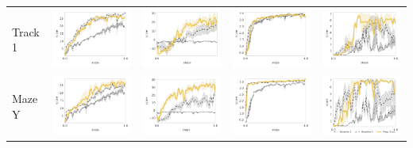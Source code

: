 \begin{table}
\begin{tabular}{m{} >{\centering}m{} >{\centering}m{} >{\centering}m{} >{\centering\arraybackslash}m{} }
	Track 1 &
        \includegraphics[width=.22\textwidth]{figures/app_plots/lab/st1/seekavoid_arena_01} &
        \includegraphics[width=.22\textwidth]{figures/app_plots/lab/st1/seekavoid_arena_02} &
        \includegraphics[width=.22\textwidth]{figures/app_plots/lab/st1/seek_maze_y_01} &
        \includegraphics[width=.22\textwidth]{figures/app_plots/lab/st1/seek_maze_m_01} \\

	Maze Y &
        \includegraphics[width=.22\textwidth]{figures/app_plots/lab/smy1/seekavoid_arena_01} &
        \includegraphics[width=.22\textwidth]{figures/app_plots/lab/smy1/seekavoid_arena_02} &
        \includegraphics[width=.22\textwidth]{figures/app_plots/lab/smy1/seek_maze_y_01} &
        \includegraphics[width=.22\textwidth]{figures/app_plots/lab_legend/smy1/seek_maze_m_01} \\
    \end{tabular}
\end{table}
